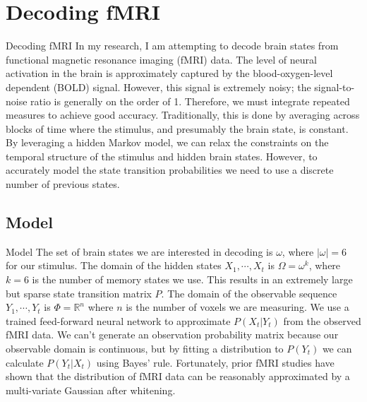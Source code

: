 \documentclass{beamer}
\begin{document}
\section{Decoding fMRI}
\begin{frame}{Decoding fMRI}
In my research, I am attempting to decode brain states from functional magnetic resonance imaging (fMRI) data.
The level of neural activation in the brain is approximately captured by the blood-oxygen-level dependent (BOLD) signal.
However, this signal is extremely noisy; the signal-to-noise ratio is generally on the order of 1.
Therefore, we must integrate repeated measures to achieve good accuracy.
Traditionally, this is done by averaging across blocks of time where the stimulus, and presumably the brain state, is constant.
By leveraging a hidden Markov model, we can relax the constraints on the temporal structure of the stimulus and hidden brain states.
However, to accurately model the state transition probabilities we need to use a discrete number of previous states.
\end{frame}

\subsection{Model}
\begin{frame}{Model}
The set of brain states we are interested in decoding is $\omega$, where $|\omega| = 6$ for our stimulus.
The domain of the hidden states $X_1, \cdots, X_t$ is $\Omega = \omega^k$, where $k = 6$ is the number of memory states we use.
This results in an extremely large but sparse state transition matrix $P$.
The domain of the observable sequence $Y_1, \cdots, Y_t$ is $\Phi = \mathbb{R}^n$ where $n$ is the number of voxels we are measuring.
We use a trained feed-forward neural network to approximate $P(X_t | Y_t)$ from the observed fMRI data.
We can't generate an observation probability matrix because our observable domain is continuous, but by fitting a distribution to $P(Y_t)$ we can calculate $P(Y_t | X_t)$ using Bayes' rule.
Fortunately, prior fMRI studies have shown that the distribution of fMRI data can be reasonably approximated by a multi-variate Gaussian after whitening.
\end{frame}
\end{document}
